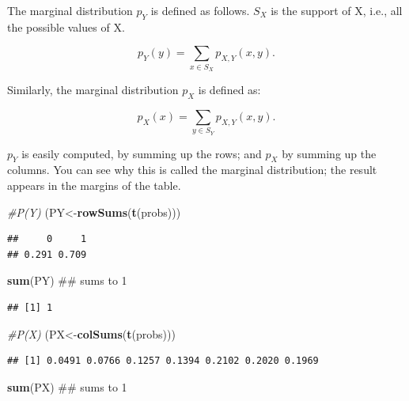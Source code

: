 \documentclass[12pt,]{krantz}
\newenvironment{Shaded}{\begin{snugshade}}{\end{snugshade}}
\newcommand{\KeywordTok}[1]{\textcolor[rgb]{0.13,0.29,0.53}{\textbf{#1}}}
\newcommand{\CommentTok}[1]{\textcolor[rgb]{0.56,0.35,0.01}{\textit{#1}}}
\newcommand{\NormalTok}[1]{#1}
\theoremstyle{definition}
\theoremstyle{definition}
\theoremstyle{definition}
\theoremstyle{remark}
\begin{document}
The marginal distribution \(p_Y\) is defined as follows. \(S_{X}\) is
the support of X, i.e., all the possible values of X.

\begin{equation}
p_{Y}(y)=\sum_{x\in S_{X}}p_{X,Y}(x,y).\label{eq-marginal-pmf}
\end{equation}

Similarly, the marginal distribution \(p_X\) is defined as:

\begin{equation}
p_{X}(x)=\sum_{y\in S_{Y}}p_{X,Y}(x,y).\label{eq-marginal-pmf2}
\end{equation}

\(p_Y\) is easily computed, by summing up the rows; and \(p_X\) by
summing up the columns. You can see why this is called the marginal
distribution; the result appears in the margins of the table.

\begin{Shaded}
\begin{Highlighting}[]
\CommentTok{#P(Y)}
\NormalTok{(PY<-}\KeywordTok{rowSums}\NormalTok{(}\KeywordTok{t}\NormalTok{(probs)))}
\end{Highlighting}
\end{Shaded}

\begin{verbatim}
##     0     1 
## 0.291 0.709
\end{verbatim}

\begin{Shaded}
\begin{Highlighting}[]
\KeywordTok{sum}\NormalTok{(PY) ## sums to 1}
\end{Highlighting}
\end{Shaded}

\begin{verbatim}
## [1] 1
\end{verbatim}

\begin{Shaded}
\begin{Highlighting}[]
\CommentTok{#P(X)}
\NormalTok{(PX<-}\KeywordTok{colSums}\NormalTok{(}\KeywordTok{t}\NormalTok{(probs)))}
\end{Highlighting}
\end{Shaded}

\begin{verbatim}
## [1] 0.0491 0.0766 0.1257 0.1394 0.2102 0.2020 0.1969
\end{verbatim}

\begin{Shaded}
\begin{Highlighting}[]
\KeywordTok{sum}\NormalTok{(PX) ## sums to 1}
\end{Highlighting}
\end{Shaded}
\end{document}
